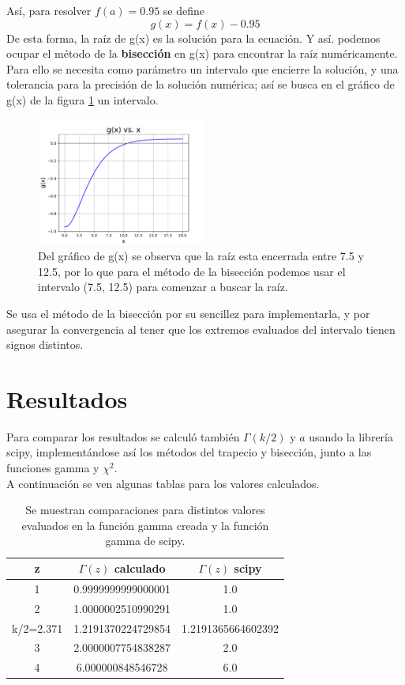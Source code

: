 \documentclass[letterpaper,oneside]{article}
\begin{document}
 Así, para resolver $f(a)=0.95$ se define
 $$g(x)=f(x)-0.95$$
 De esta forma, la raíz de g(x) es la solución para la ecuación. Y así. podemos ocupar el método de la \textbf{bisección} en g(x) para encontrar la raíz numéricamente. Para ello se necesita como parámetro un intervalo que encierre la solución, y una tolerancia para la precisión de la solución numérica; así se busca en el gráfico de g(x) de la figura \ref{grafico g(x)} un intervalo.
 
 \begin{figure}[h]
\includegraphics[width=0.5\textwidth]{grafico g(x).pdf}
\caption{Del gráfico de g(x) se observa que la raíz esta encerrada entre 7.5 y 12.5, por lo que para el método de la bisección podemos usar el intervalo (7.5, 12.5) para comenzar a buscar la raíz.}
    \label{grafico g(x)}
\centering
\end{figure}
 Se usa el método de la bisección por su sencillez para implementarla, y por asegurar la convergencia al tener que los extremos evaluados del intervalo tienen signos distintos. 
 
 
 \section{Resultados}
 Para comparar los resultados se calculó también $\Gamma(k/2)$ y $a$ usando la librería scipy, implementándose así los métodos del trapecio y bisección, junto a las funciones gamma y $\chi^2$.\\
 A continuación se ven algunas tablas para los valores calculados.
 \begin{table}
 \caption{Se muestran comparaciones para distintos valores evaluados en la función gamma creada y la función gamma de scipy.}
\begin{tabular}{|c|c|c|}
\hline
\textbf{z} & \textbf{$\Gamma(z)$ calculado} & \textbf{$\Gamma(z)$ scipy} \\ \hline
1          & 0.9999999999000001          & 1.0                     \\ \hline
2          & 1.0000002510990291          & 1.0                     \\ \hline
k/2=2.371  & 1.2191370224729854          & 1.2191365664602392      \\ \hline
3          & 2.0000007754838287          & 2.0                     \\ \hline
4          & 6.000000848546728           & 6.0                     \\ \hline
\end{tabular}
\end{table}
\end{document}
